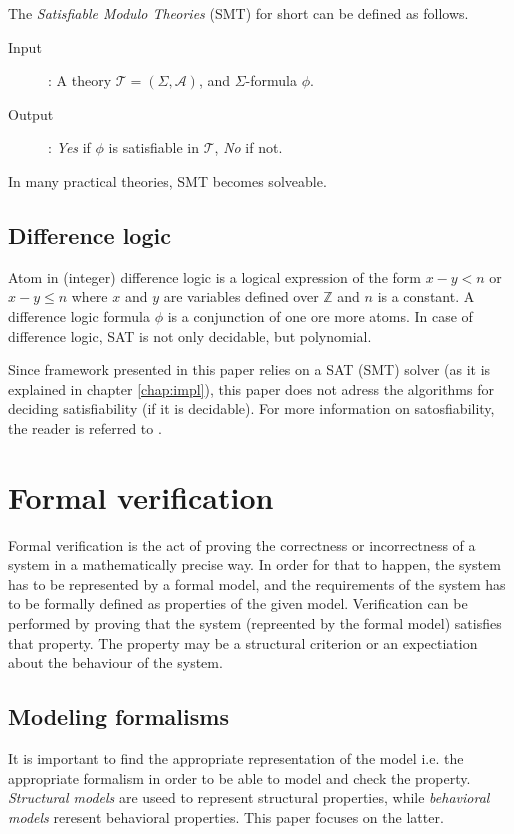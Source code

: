 The \emph{Satisfiable Modulo Theories} (SMT) for short can be defined as follows.
\begin{description}
	\item[Input]: A theory $\mathcal{T}=(\Sigma,\mathcal{A})$, and $\Sigma$-formula $\phi$.
	\item[Output]: \emph{Yes} if $\phi$ is satisfiable in $\mathcal{T}$, \emph{No} if not.
\end{description}

In many practical theories, SMT becomes solveable.

\subsection{Difference logic}

Atom in (integer) difference logic is a logical expression of the form $x-y<n$ or $x-y \leq n$ where $x$ and $y$ are variables defined over $\mathds{Z}$ and $n$ is a constant. A difference logic formula $\phi$ is a conjunction of one ore more atoms. In case of difference logic, SAT is not only decidable, but polynomial.

Since framework presented in this paper relies on a SAT (SMT) solver (as it is explained in chapter \ref{chap:impl}), this paper does not adress the algorithms for deciding satisfiability (if it is decidable). For more information on satosfiability, the reader is referred to .


\section{Formal verification}

Formal verification is the act of proving the correctness or incorrectness of a system in a mathematically precise way. In order for that to happen, the system has to be represented by a formal model, and the requirements of the system has to be formally defined as properties of the given model. Verification can be performed by proving that the system (repreented by the formal model) satisfies that property. The property may be a structural criterion or an expectiation about the behaviour of the system.

\subsection{Modeling formalisms}
It is important to find the appropriate representation of the model i.e. the appropriate formalism in order to be able to model and check the property. \emph{Structural models} are useed to represent structural properties, while \emph{behavioral models} reresent behavioral properties. This paper focuses on the latter.

